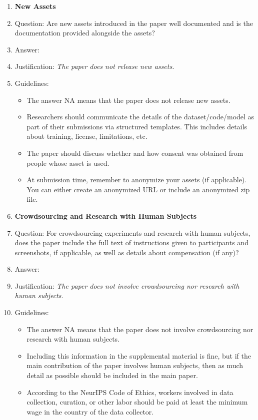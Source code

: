 \documentclass{article}
\theoremstyle{plain}
\begin{document}
\begin{enumerate}
\item {\bf New Assets}
    \item[] Question: Are new assets introduced in the paper well documented and is the documentation provided alongside the assets?
    \item[] Answer: \answerNA %
    \item[] Justification: \textit{The paper does not release new assets.}
    \item[] Guidelines:
    \begin{itemize}
        \item The answer NA means that the paper does not release new assets.
        \item Researchers should communicate the details of the dataset/code/model as part of their submissions via structured templates. This includes details about training, license, limitations, etc. 
        \item The paper should discuss whether and how consent was obtained from people whose asset is used.
        \item At submission time, remember to anonymize your assets (if applicable). You can either create an anonymized URL or include an anonymized zip file.
    \end{itemize}

\item {\bf Crowdsourcing and Research with Human Subjects}
    \item[] Question: For crowdsourcing experiments and research with human subjects, does the paper include the full text of instructions given to participants and screenshots, if applicable, as well as details about compensation (if any)? 
    \item[] Answer: \answerNA %
    \item[] Justification: \textit{The paper does not involve crowdsourcing nor research with human subjects.}
    \item[] Guidelines:
    \begin{itemize}
        \item The answer NA means that the paper does not involve crowdsourcing nor research with human subjects.
        \item Including this information in the supplemental material is fine, but if the main contribution of the paper involves human subjects, then as much detail as possible should be included in the main paper. 
        \item According to the NeurIPS Code of Ethics, workers involved in data collection, curation, or other labor should be paid at least the minimum wage in the country of the data collector. 
    \end{itemize}


\end{enumerate}
\end{document}
